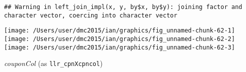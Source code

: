 \documentclass[10pt]{report}
\newenvironment{Shaded}{}{}
\newcommand{\KeywordTok}[1]{\textcolor[rgb]{0.00,0.44,0.13}{\textbf{{#1}}}}
\newcommand{\DataTypeTok}[1]{\textcolor[rgb]{0.56,0.13,0.00}{{#1}}}
\newcommand{\StringTok}[1]{\textcolor[rgb]{0.25,0.44,0.63}{{#1}}}
\newcommand{\NormalTok}[1]{{#1}}
\begin{document}
\begin{Shaded}
\end{Shaded}

\begin{verbatim}
## Warning in left_join_impl(x, y, by$x, by$y): joining factor and character vector, coercing into character vector
\end{verbatim}

\begin{Shaded}
\end{Shaded}

\begin{center}\texttt{[image: /Users/user/dmc2015/ian/graphics/fig\_unnamed-chunk-62-1]} \texttt{[image: /Users/user/dmc2015/ian/graphics/fig\_unnamed-chunk-62-2]} \texttt{[image: /Users/user/dmc2015/ian/graphics/fig\_unnamed-chunk-62-3]} \end{center}

\emph{couponCol} (as \texttt{llr\_cpnXcpncol})
\end{document}
